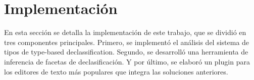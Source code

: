 \chapter{Implementación}
En esta sección se detalla la implementación de este trabajo, que se dividió en tres componentes principales. Primero, se implementó el análisis del sistema de tipos de type-based declassification. Segundo, se desarrolló una herramienta de inferencia de facetas de declasificación. Y por último, se elaboró un plugin para los editores de texto más populares que integra las soluciones anteriores.
